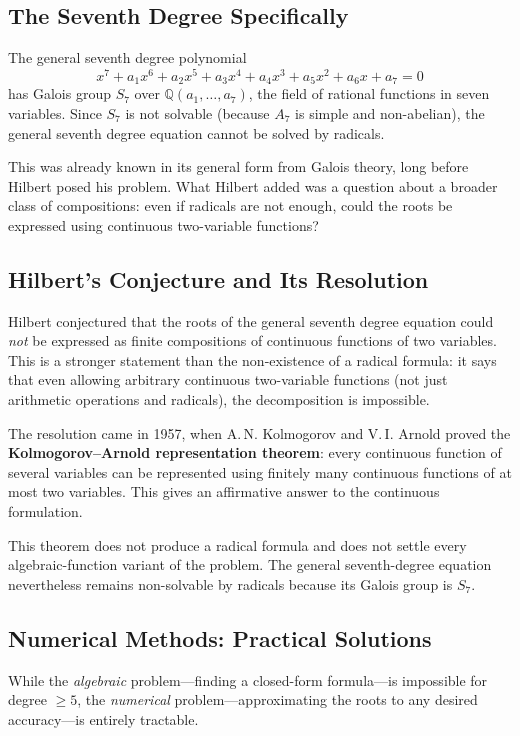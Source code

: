 \subsection{The Seventh Degree Specifically}

The general seventh degree polynomial
\[
    x^7 + a_1 x^6 + a_2 x^5 + a_3 x^4 + a_4 x^3 + a_5 x^2 + a_6 x + a_7 = 0
\]
has Galois group $S_7$ over $\mathbb{Q}(a_1, \ldots, a_7)$, the field of rational functions in seven variables. Since $S_7$ is not solvable (because $A_7$ is simple and non-abelian), the general seventh degree equation cannot be solved by radicals.

This was already known in its general form from Galois theory, long before Hilbert posed his problem. What Hilbert added was a question about a broader class of compositions: even if radicals are not enough, could the roots be expressed using continuous two-variable functions?

\subsection{Hilbert's Conjecture and Its Resolution}

Hilbert conjectured that the roots of the general seventh degree equation could \emph{not} be expressed as finite compositions of continuous functions of two variables. This is a stronger statement than the non-existence of a radical formula: it says that even allowing arbitrary continuous two-variable functions (not just arithmetic operations and radicals), the decomposition is impossible.

The resolution came in 1957, when A.\,N. Kolmogorov and V.\,I. Arnold proved the \textbf{Kolmogorov--Arnold representation theorem}: every continuous function of several variables can be represented using finitely many continuous functions of at most two variables. This gives an affirmative answer to the continuous formulation.

This theorem does not produce a radical formula and does not settle every algebraic-function variant of the problem. The general seventh-degree equation nevertheless remains non-solvable by radicals because its Galois group is $S_7$.

\subsection{Numerical Methods: Practical Solutions}

While the \emph{algebraic} problem---finding a closed-form formula---is impossible for degree $\geq 5$, the \emph{numerical} problem---approximating the roots to any desired accuracy---is entirely tractable.

